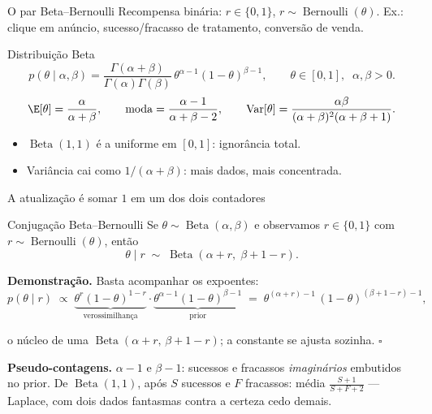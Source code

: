 \documentclass[aspectratio=169, 11pt]{beamer}
\newcommand{\Bdist}{\operatorname{Beta}}
\newcommand{\Bern}{\operatorname{Bernoulli}}
\begin{document}
\begin{frame}{O par Beta--Bernoulli}
  Recompensa binária: $r \in \{0,1\}$, $r \sim \Bern(\theta)$.
  Ex.: clique em anúncio, sucesso/fracasso de tratamento, conversão de
  venda.

  \begin{defbox}{Distribuição Beta}
    \[
      p(\theta \mid \alpha, \beta)
      = \frac{\Gamma(\alpha+\beta)}{\Gamma(\alpha)\Gamma(\beta)}\,
        \theta^{\alpha-1}(1-\theta)^{\beta-1},
      \qquad \theta \in [0,1],\;\; \alpha,\beta > 0.
    \]
    \[
      \E[\theta] = \frac{\alpha}{\alpha+\beta},
      \qquad
      \mathrm{moda} = \frac{\alpha-1}{\alpha+\beta-2},
      \qquad
      \mathrm{Var}[\theta] = \frac{\alpha\beta}{(\alpha+\beta)^2(\alpha+\beta+1)} .
    \]
  \end{defbox}

  \begin{itemize}
    \item $\Bdist(1,1)$ é a \alert{uniforme} em $[0,1]$: ignorância total.
    \item Variância cai como $1/(\alpha+\beta)$: mais dados, mais
          concentrada.
  \end{itemize}
\end{frame}

\begin{frame}{A atualização é somar $1$ em um dos dois contadores}
  \begin{teobox}{Conjugação Beta--Bernoulli}
    Se $\theta \sim \Bdist(\alpha,\beta)$ e observamos $r \in \{0,1\}$ com
    $r \sim \Bern(\theta)$, então
    \[
      \theta \mid r \;\sim\; \Bdist(\alpha + r,\; \beta + 1 - r).
    \]
  \end{teobox}

  {\small
  \textbf{Demonstração.} Basta acompanhar os expoentes:
  \vspace{-0.4em}
  \[
    p(\theta \mid r) \;\propto\; \underbrace{\theta^{r}(1-\theta)^{1-r}}_{\text{verossimilhança}}
      \cdot \underbrace{\theta^{\alpha-1}(1-\theta)^{\beta-1}}_{\text{prior}}
    \;=\; \theta^{(\alpha + r)-1}\,(1-\theta)^{(\beta + 1 - r)-1},
  \]
  \vspace{-1.1em}

  o núcleo de uma $\Bdist(\alpha+r,\,\beta+1-r)$; a constante se ajusta
  sozinha. $\square$}

  \begin{ideiabox}
    \textbf{Pseudo-contagens.} $\alpha-1$ e $\beta-1$: sucessos e
    fracassos \emph{imaginários} embutidos no prior. De $\Bdist(1,1)$,
    após $S$ sucessos e $F$ fracassos: média $\frac{S+1}{S+F+2}$ —
    Laplace, com dois dados fantasmas contra a certeza cedo demais.
  \end{ideiabox}
\end{frame}
\end{document}
